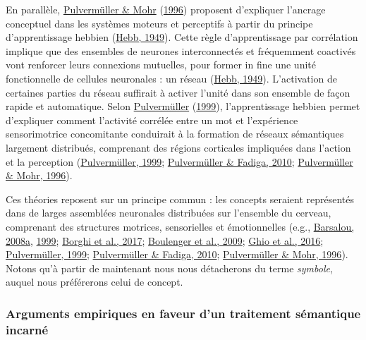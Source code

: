 \documentclass[
  a4paper,12pt,twoside,onecolumn,openright,final,oldfontcommands]{memoir}
\begin{document}
En parallèle, \protect\hyperlink{ref-pulvermuller_concept_1996}{Pulvermüller \& Mohr} (\protect\hyperlink{ref-pulvermuller_concept_1996}{1996}) proposent d'expliquer l'ancrage conceptuel dans les systèmes moteurs et perceptifs à partir du principe d'apprentissage hebbien (\protect\hyperlink{ref-hebb_organization_1949}{Hebb, 1949}). Cette règle d'apprentissage par corrélation implique que des ensembles de neurones interconnectés et fréquemment coactivés vont renforcer leurs connexions mutuelles, pour former in fine une unité fonctionnelle de cellules neuronales : un réseau (\protect\hyperlink{ref-hebb_organization_1949}{Hebb, 1949}). L'activation de certaines parties du réseau suffirait à activer l'unité dans son ensemble de façon rapide et automatique. Selon \protect\hyperlink{ref-pulvermuller_words_1999}{Pulvermüller} (\protect\hyperlink{ref-pulvermuller_words_1999}{1999}), l'apprentissage hebbien permet d'expliquer comment l'activité corrélée entre un mot et l'expérience sensorimotrice concomitante conduirait à la formation de réseaux sémantiques largement distribués, comprenant des régions corticales impliquées dans l'action et la perception (\protect\hyperlink{ref-pulvermuller_words_1999}{Pulvermüller, 1999}; \protect\hyperlink{ref-pulvermuller_active_2010}{Pulvermüller \& Fadiga, 2010}; \protect\hyperlink{ref-pulvermuller_concept_1996}{Pulvermüller \& Mohr, 1996}).

Ces théories reposent sur un principe commun : les concepts seraient représentés dans de larges assemblées neuronales distribuées sur l'ensemble du cerveau, comprenant des structures motrices, sensorielles et émotionnelles (e.g., \protect\hyperlink{ref-barsalou_grounded_2008}{Barsalou, 2008a}, \protect\hyperlink{ref-barsalou_perceptual_1999}{1999}; \protect\hyperlink{ref-borghi_challenge_2017}{Borghi et al., 2017}; \protect\hyperlink{ref-boulenger_grasping_2009}{Boulenger et al., 2009}; \protect\hyperlink{ref-ghio_decoding_2016}{Ghio et al., 2016}; \protect\hyperlink{ref-pulvermuller_words_1999}{Pulvermüller, 1999}; \protect\hyperlink{ref-pulvermuller_active_2010}{Pulvermüller \& Fadiga, 2010}; \protect\hyperlink{ref-pulvermuller_concept_1996}{Pulvermüller \& Mohr, 1996}). Notons qu'à partir de maintenant nous nous détacherons du terme \emph{symbole}, auquel nous préférerons celui de concept.

\hypertarget{pred}{%
\subsubsection{Arguments empiriques en faveur d'un traitement sémantique incarné}\label{pred}}
\end{document}
